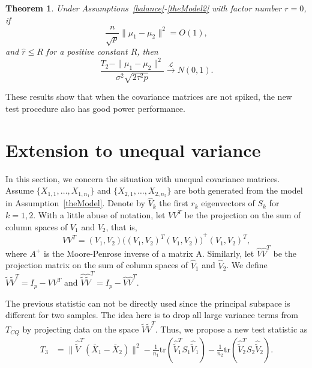 \documentclass[review]{elsarticle}
\theoremstyle{plain}
\newtheorem{theorem}{\quad\quad Theorem}
\theoremstyle{definition}
\theoremstyle{remark}
\begin{document}
\begin{theorem}\label{sameTheorem2}
    Under Assumptions~\ref{balance}-\ref{theModel2} with factor number $r=0$, if
    $$
    \frac{n}{\sqrt{p}}\|\mu_1-\mu_2\|^2=O(1),
    $$
    and $\hat{r}\leq R$ for a positive constant $R$,
    then
    $$
    \frac{T_2-\|\mu_1-\mu_2\|^2}{\sigma^2\sqrt{2\tau^2 p}}\xrightarrow{\mathcal{L}} N(0,1).
    $$
\end{theorem}
These results show that when the covariance matrices are not spiked, the new test procedure also has good power performance.


\section{Extension to unequal variance}

In this section, we concern the situation with unequal covariance matrices.
Assume $\{X_{1,1},\ldots, X_{1,n_1}\}$ and $\{X_{2,1},\ldots, X_{2,n_2}\}$ are both generated from the model in Assumption~\ref{theModel}.
Denote by $\hat{V}_k$ the first $r_k$ eigenvectors of $S_k$ for $k=1,2$.
With a little abuse of notation, let $VV^T$ be the projection on the sum of column spaces of $V_1$ and $V_2$, that is,
\begin{equation*}
    VV^T =(V_1,V_2){\big({(V_1,V_2)}^T (V_1,V_2)\big)}^{+}{(V_1,V_2)}^T,
\end{equation*}
where $A^{+}$ is the Moore-Penrose inverse of a matrix A. Similarly, let $\hat{V}\hat{V}^T$ be the projection matrix on the sum of column spaces of $\hat{V}_1$ and $\hat{V}_2$.
 We define $\tilde{V}\tilde{V}^T=I_{p}-VV^T$ and $\hat{\tilde{V}}\hat{\tilde{V}}^T=I_{p}-\hat{V}\hat{V}^T$. 

The previous statistic can not be directly used since the principal subspace is different for two samples.
The idea here is to drop all large variance terms from $T_{CQ}$ by projecting data on the space $\tilde{V}\tilde{V}^T$. Thus, we propose a new test statistic as
\begin{equation*}
\begin{aligned}
    T_3&=\|\hat{\tilde{V}}^T(\bar{X}_1-\bar{X}_2)\|^2-\frac{1}{n_1}\mathrm{tr}(\hat{\tilde{V}}_1^T S_1\hat{\tilde{V}}_1)-\frac{1}{n_2}\mathrm{tr}(\hat{\tilde{V}}_2^T S_2\hat{\tilde{V}}_2).
\end{aligned}
\end{equation*}
\end{document}
